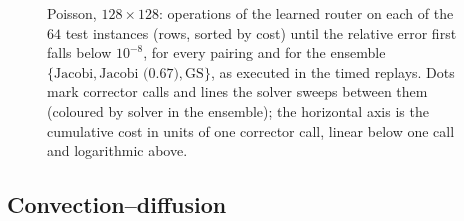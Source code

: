 \begin{figure}[H]
\color{red}
    \centering
    \caption{Poisson, $128\times128$: operations of the learned router on each of the $64$ test instances (rows, sorted by cost) until the relative error first falls below $10^{-8}$, for every pairing and for the ensemble $\{\text{Jacobi}, \text{Jacobi (0.67)}, \text{GS}\}$, as executed in the timed replays. Dots mark corrector calls and lines the solver sweeps between them (coloured by solver in the ensemble); the horizontal axis is the cumulative cost in units of one corrector call, linear below one call and logarithmic above.}
    \label{fig:ca_decisions_poisson}
\end{figure}

\subsection{Convection--diffusion} \label{sec:wc_conv}

